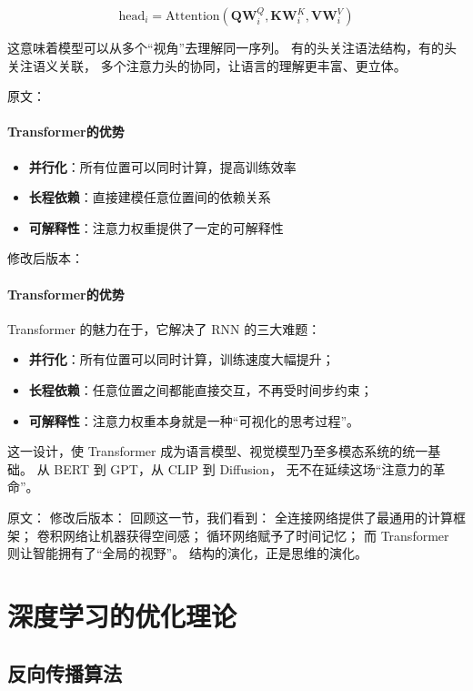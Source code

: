$$\text{head}_i = \text{Attention}(\mathbf{Q}\mathbf{W}_i^Q, \mathbf{K}\mathbf{W}_i^K, \mathbf{V}\mathbf{W}_i^V)$$

这意味着模型可以从多个“视角”去理解同一序列。  
有的头关注语法结构，有的头关注语义关联，  
多个注意力头的协同，让语言的理解更丰富、更立体。



原文：
\paragraph{Transformer的优势}
\begin{itemize}
\item \textbf{并行化}：所有位置可以同时计算，提高训练效率
\item \textbf{长程依赖}：直接建模任意位置间的依赖关系
\item \textbf{可解释性}：注意力权重提供了一定的可解释性
\end{itemize}
修改后版本：
\paragraph{Transformer的优势}  
Transformer 的魅力在于，它解决了 RNN 的三大难题：

\begin{itemize}
\item \textbf{并行化}：所有位置可以同时计算，训练速度大幅提升；
\item \textbf{长程依赖}：任意位置之间都能直接交互，不再受时间步约束；
\item \textbf{可解释性}：注意力权重本身就是一种“可视化的思考过程”。
\end{itemize}

这一设计，使 Transformer 成为语言模型、视觉模型乃至多模态系统的统一基础。  
从 BERT 到 GPT，从 CLIP 到 Diffusion，  
无不在延续这场“注意力的革命”。



原文：
修改后版本：
回顾这一节，我们看到：  
全连接网络提供了最通用的计算框架；  
卷积网络让机器获得空间感；  
循环网络赋予了时间记忆；  
而 Transformer 则让智能拥有了“全局的视野”。  
结构的演化，正是思维的演化。

\section{深度学习的优化理论}

\subsection{反向传播算法}

